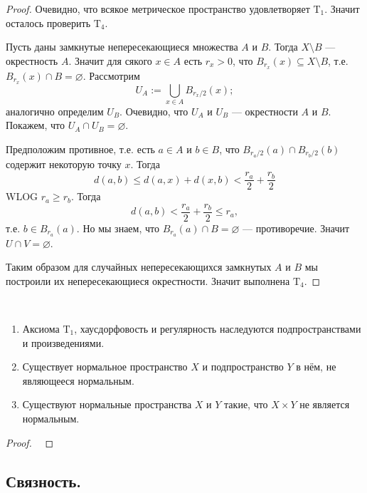 \documentclass[12pt,a4paper]{article}
\newcommand{\T}{\ensuremath{\mathrm{T}}\xspace}
\begin{document}
    \begin{proof}
        Очевидно, что всякое метрическое пространство удовлетворяет $\T_1$. Значит осталось проверить $\T_4$.

        Пусть даны замкнутые непересекающиеся множества $A$ и $B$. Тогда $X \setminus B$ --- окрестность $A$. Значит для сякого $x \in A$ есть $r_x > 0$, что $B_{r_x}(x) \subseteq X \setminus B$, т.е. $B_{r_x}(x) \cap B = \varnothing$. Рассмотрим
        \[U_A := \bigcup_{x \in A} B_{r_x/2}(x);\]
        аналогично определим $U_B$. Очевидно, что $U_A$ и $U_B$ --- окрестности $A$ и $B$. Покажем, что $U_A \cap U_B = \varnothing$.

        Предположим противное, т.е. есть $a \in A$ и $b \in B$, что $B_{r_a/2}(a) \cap B_{r_b/2}(b)$ содержит некоторую точку $x$. Тогда
        \[d(a, b) \leqslant d(a, x) + d(x, b) < \frac{r_a}{2} + \frac{r_b}{2}\]
        WLOG $r_a \geqslant r_b$. Тогда
        \[d(a, b) < \frac{r_a}{2} + \frac{r_b}{2} \leqslant r_a,\]
        т.е. $b \in B_{r_a}(a)$. Но мы знаем, что $B_{r_a}(a) \cap B = \varnothing$ --- противоречие. Значит $U \cap V = \varnothing$.

        Таким образом для случайных непересекающихся замкнутых $A$ и $B$ мы построили их непересекающиеся окрестности. Значит выполнена $\T_4$.
    \end{proof}

    \begin{lemma}\ 
        \begin{enumerate}
            \item Аксиома $\T_1$, хаусдорфовость и регулярность наследуются подпространствами и произведениями.
            \item Существует нормальное пространство $X$ и подпространство $Y$ в нём, не являющееся нормальным.
            \item Существуют нормальные пространства $X$ и $Y$ такие, что $X \times Y$ не является нормальным.
        \end{enumerate}
    \end{lemma}

    \begin{proof}\ 
    \end{proof}

    \subsection{Связность.}
\end{document}
